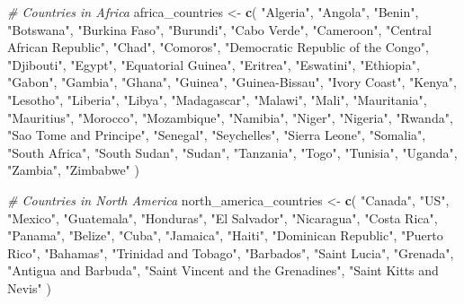 \documentclass[
]{article}
\newenvironment{Shaded}{\begin{snugshade}}{\end{snugshade}}
\newcommand{\CommentTok}[1]{\textcolor[rgb]{0.56,0.35,0.01}{\textit{#1}}}
\newcommand{\FunctionTok}[1]{\textcolor[rgb]{0.13,0.29,0.53}{\textbf{#1}}}
\newcommand{\NormalTok}[1]{#1}
\newcommand{\OtherTok}[1]{\textcolor[rgb]{0.56,0.35,0.01}{#1}}
\newcommand{\StringTok}[1]{\textcolor[rgb]{0.31,0.60,0.02}{#1}}
\begin{document}
\begin{Shaded}
\begin{Highlighting}[]
\CommentTok{\# Countries in Africa}
\NormalTok{africa\_countries }\OtherTok{\textless{}{-}} \FunctionTok{c}\NormalTok{(}
  \StringTok{"Algeria"}\NormalTok{, }\StringTok{"Angola"}\NormalTok{, }\StringTok{"Benin"}\NormalTok{, }\StringTok{"Botswana"}\NormalTok{, }\StringTok{"Burkina Faso"}\NormalTok{, }\StringTok{"Burundi"}\NormalTok{, }
  \StringTok{"Cabo Verde"}\NormalTok{, }\StringTok{"Cameroon"}\NormalTok{, }\StringTok{"Central African Republic"}\NormalTok{, }\StringTok{"Chad"}\NormalTok{, }
  \StringTok{"Comoros"}\NormalTok{, }\StringTok{"Democratic Republic of the Congo"}\NormalTok{, }\StringTok{"Djibouti"}\NormalTok{, }\StringTok{"Egypt"}\NormalTok{, }
  \StringTok{"Equatorial Guinea"}\NormalTok{, }\StringTok{"Eritrea"}\NormalTok{, }\StringTok{"Eswatini"}\NormalTok{, }\StringTok{"Ethiopia"}\NormalTok{, }\StringTok{"Gabon"}\NormalTok{, }
  \StringTok{"Gambia"}\NormalTok{, }\StringTok{"Ghana"}\NormalTok{, }\StringTok{"Guinea"}\NormalTok{, }\StringTok{"Guinea{-}Bissau"}\NormalTok{, }\StringTok{"Ivory Coast"}\NormalTok{, }
  \StringTok{"Kenya"}\NormalTok{, }\StringTok{"Lesotho"}\NormalTok{, }\StringTok{"Liberia"}\NormalTok{, }\StringTok{"Libya"}\NormalTok{, }\StringTok{"Madagascar"}\NormalTok{, }\StringTok{"Malawi"}\NormalTok{, }
  \StringTok{"Mali"}\NormalTok{, }\StringTok{"Mauritania"}\NormalTok{, }\StringTok{"Mauritius"}\NormalTok{, }\StringTok{"Morocco"}\NormalTok{, }\StringTok{"Mozambique"}\NormalTok{, }
  \StringTok{"Namibia"}\NormalTok{, }\StringTok{"Niger"}\NormalTok{, }\StringTok{"Nigeria"}\NormalTok{, }\StringTok{"Rwanda"}\NormalTok{, }\StringTok{"Sao Tome and Principe"}\NormalTok{, }
  \StringTok{"Senegal"}\NormalTok{, }\StringTok{"Seychelles"}\NormalTok{, }\StringTok{"Sierra Leone"}\NormalTok{, }\StringTok{"Somalia"}\NormalTok{, }\StringTok{"South Africa"}\NormalTok{, }
  \StringTok{"South Sudan"}\NormalTok{, }\StringTok{"Sudan"}\NormalTok{, }\StringTok{"Tanzania"}\NormalTok{, }\StringTok{"Togo"}\NormalTok{, }\StringTok{"Tunisia"}\NormalTok{, }\StringTok{"Uganda"}\NormalTok{, }
  \StringTok{"Zambia"}\NormalTok{, }\StringTok{"Zimbabwe"}
\NormalTok{)}

\CommentTok{\# Countries in North America}
\NormalTok{north\_america\_countries }\OtherTok{\textless{}{-}} \FunctionTok{c}\NormalTok{(}
  \StringTok{"Canada"}\NormalTok{, }\StringTok{"US"}\NormalTok{, }\StringTok{"Mexico"}\NormalTok{, }\StringTok{"Guatemala"}\NormalTok{, }\StringTok{"Honduras"}\NormalTok{, }
  \StringTok{"El Salvador"}\NormalTok{, }\StringTok{"Nicaragua"}\NormalTok{, }\StringTok{"Costa Rica"}\NormalTok{, }\StringTok{"Panama"}\NormalTok{, }\StringTok{"Belize"}\NormalTok{, }
  \StringTok{"Cuba"}\NormalTok{, }\StringTok{"Jamaica"}\NormalTok{, }\StringTok{"Haiti"}\NormalTok{, }\StringTok{"Dominican Republic"}\NormalTok{, }\StringTok{"Puerto Rico"}\NormalTok{, }
  \StringTok{"Bahamas"}\NormalTok{, }\StringTok{"Trinidad and Tobago"}\NormalTok{, }\StringTok{"Barbados"}\NormalTok{, }\StringTok{"Saint Lucia"}\NormalTok{, }
  \StringTok{"Grenada"}\NormalTok{, }\StringTok{"Antigua and Barbuda"}\NormalTok{, }\StringTok{"Saint Vincent and the Grenadines"}\NormalTok{, }
  \StringTok{"Saint Kitts and Nevis"}
\NormalTok{)}


\end{Highlighting}
\end{Shaded}
\end{document}
